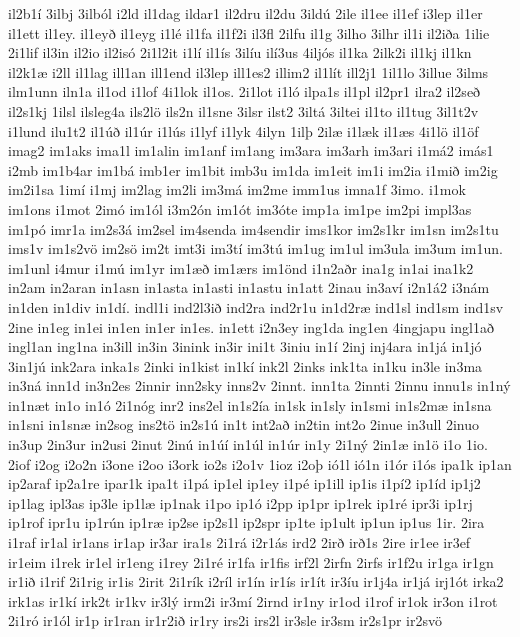 {il2b1í
3ilbj
3ilból
i2ld
il1dag
ildar1
il2dru
il2du
3ildú
2ile
il1ee
il1ef
i3lep
il1er
il1ett
il1ey.
il1eyð
il1eyg
i1lé
il1fa
il1f2i
il3fl
2ilfu
il1g
3ilho
3ilhr
il1i
il2iða
1ilie
2i1lif
il3in
il2io
il2isó
2i1l2it
i1lí
il1ís
3ilíu
ilí3us
4iljós
il1ka
2ilk2i
il1kj
il1kn
il2k1æ
i2ll
il1lag
ill1an
ill1end
il3lep
ill1es2
illim2
il1lít
ill2j1
1il1lo
3illue
3ilms
ilm1unn
iln1a
il1od
i1lof
4i1lok
il1os.
2i1lot
i1ló
ilpa1s
il1pl
il2pr1
ilra2
il2seð
il2s1kj
1ilsl
ilsleg4a
ils2lö
ils2n
il1sne
3ilsr
ilst2
3iltá
3iltei
il1to
il1tug
3il1t2v
i1lund
ilu1t2
il1úð
il1úr
i1lús
i1lyf
i1lyk
4ilyn
1ilþ
2ilæ
i1læk
il1æs
4i1lö
il1öf
imag2
im1aks
ima1l
im1alin
im1anf
im1ang
im3ara
im3arh
im3ari
i1má2
imás1
i2mb
im1b4ar
im1bá
imb1er
im1bit
imb3u
im1da
im1eit
im1i
im2ia
i1mið
im2ig
im2i1sa
1imí
i1mj
im2lag
im2li
im3má
im2me
imm1us
imna1f
3imo.
i1mok
im1ons
i1mot
2imó
im1ól
i3m2ón
im1ót
im3óte
imp1a
im1pe
im2pi
impl3as
im1pó
imr1a
im2s3á
im2sel
im4senda
im4sendir
ims1kor
im2s1kr
im1sn
im2s1tu
ims1v
im1s2vö
im2sö
im2t
imt3i
im3tí
im3tú
im1ug
im1ul
im3ula
im3um
im1un.
im1unl
i4mur
i1mú
im1yr
im1æð
im1ærs
im1önd
i1n2aðr
ina1g
in1ai
ina1k2
in2am
in2aran
in1asn
in1asta
in1asti
in1astu
in1att
2inau
in3aví
i2n1á2
i3nám
in1den
in1div
in1dí.
indl1i
ind2l3ið
ind2ra
ind2r1u
in1d2ræ
ind1sl
ind1sm
ind1sv
2ine
in1eg
in1ei
in1en
in1er
in1es.
in1ett
i2n3ey
ing1da
ing1en
4ingjapu
ingl1að
ingl1an
ing1na
in3ill
in3in
3inink
in3ir
ini1t
3iniu
in1í
2inj
inj4ara
in1já
in1jó
3in1jú
ink2ara
inka1s
2inki
in1kist
in1kí
ink2l
2inks
ink1ta
in1ku
in3le
in3ma
in3ná
inn1d
in3n2es
2innir
inn2sky
inns2v
2innt.
inn1ta
2innti
2innu
innu1s
in1ný
in1næt
in1o
in1ó
2i1nóg
inr2
ins2el
in1s2ía
in1sk
in1sly
in1smi
in1s2mæ
in1sna
in1sni
in1snæ
in2sog
ins2tö
in2s1ú
in1t
int2að
in2tin
int2o
2inue
in3ull
2inuo
in3up
2in3ur
in2usi
2inut
2inú
in1úí
in1úl
in1úr
in1y
2i1ný
2in1æ
in1ö
i1o
1io.
2iof
i2og
i2o2n
i3one
i2oo
i3ork
io2s
i2o1v
1ioz
i2oþ
ió1l
ió1n
i1ór
i1ós
ipa1k
ip1an
ip2araf
ip2a1re
ipar1k
ipa1t
i1pá
ip1el
ip1ey
i1pé
ip1ill
ip1is
i1pí2
ip1íd
ip1j2
ip1lag
ipl3as
ip3le
ip1læ
ip1nak
i1po
ip1ó
i2pp
ip1pr
ip1rek
ip1ré
ipr3i
ip1rj
ip1rof
ipr1u
ip1rún
ip1ræ
ip2se
ip2s1l
ip2spr
ip1te
ip1ult
ip1un
ip1us
1ir.
2ira
i1raf
ir1al
ir1ans
ir1ap
ir3ar
ira1s
2i1rá
i2r1ás
ird2
2irð
irð1s
2ire
ir1ee
ir3ef
ir1eim
i1rek
ir1el
ir1eng
i1rey
2i1ré
ir1fa
ir1fis
irf2l
2irfn
2irfs
ir1f2u
ir1ga
ir1gn
ir1ið
i1rif
2i1rig
ir1is
2irit
2i1rík
i2ríl
ir1ín
ir1ís
ir1ít
ir3íu
ir1j4a
ir1já
irj1ót
irka2
irk1as
ir1kí
irk2t
ir1kv
ir3lý
irm2i
ir3mí
2irnd
ir1ny
ir1od
i1rof
ir1ok
ir3on
i1rot
2i1ró
ir1ól
ir1p
ir1ran
ir1r2ið
ir1ry
irs2i
irs2l
ir3sle
ir3sm
ir2s1pr
ir2svö
}
